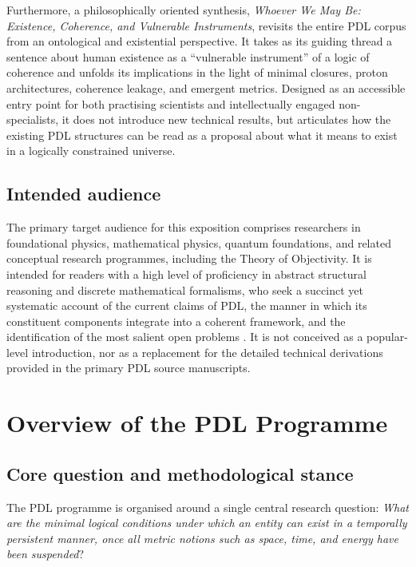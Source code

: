 \documentclass[11pt,a4paper]{article}
\begin{document}
Furthermore, a philosophically oriented synthesis, \textit{Whoever We May Be: Existence, Coherence, and Vulnerable Instruments}, revisits the entire PDL corpus from an ontological and existential perspective.\citep{WhoeverWeMayBe2026} It takes as its guiding thread a sentence about human existence as a ``vulnerable instrument'' of a logic of coherence and unfolds its implications in the light of minimal closures, proton architectures, coherence leakage, and emergent metrics.\citep{WhoeverWeMayBe2026} Designed as an accessible entry point for both practising scientists and intellectually engaged non-specialists, it does not introduce new technical results, but articulates how the existing PDL structures can be read as a proposal about what it means to exist in a logically constrained universe.\citep{WhoeverWeMayBe2026}

\subsection{Intended audience}
\label{subsec:intended_audience}

The primary target audience for this exposition comprises researchers in foundational physics, mathematical physics, quantum foundations, and related conceptual research programmes, including the Theory of Objectivity. It is intended for readers with a high level of proficiency in abstract structural reasoning and discrete mathematical formalisms, who seek a succinct yet systematic account of the current claims of PDL, the manner in which its constituent components integrate into a coherent framework, and the identification of the most salient open problems \citep{PDL_intro,PDL_TO_dialogue,PDL_position}. It is not conceived as a popular-level introduction, nor as a replacement for the detailed technical derivations provided in the primary PDL source manuscripts.

\section{Overview of the PDL Programme}
\label{sec:overview}

\subsection{Core question and methodological stance}
\label{subsec:core_question}

The PDL programme is organised around a single central research question: \emph{What are the minimal logical conditions under which an entity can exist in a temporally persistent manner, once all metric notions such as space, time, and energy have been suspended}? \citep{PDL_Main_2026,PDL_intro}
\end{document}
